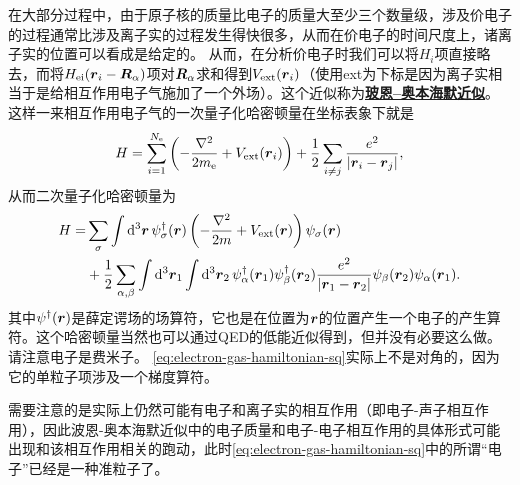 \documentclass[hyperref, UTF8, a4paper]{ctexart}
\newcommand*{\concept}[1]{\underline{\textbf{#1}}}
\begin{document}
在大部分过程中，由于原子核的质量比电子的质量大至少三个数量级，涉及价电子的过程通常比涉及离子实的过程发生得快很多，从而在价电子的时间尺度上，诸离子实的位置可以看成是给定的。
从而，在分析价电子时我们可以将${H}_i$项直接略去，而将${H}_\text{ei}(\vb*{r}_i-\vb*{R}_\alpha)$项对$\vb*{R}_\alpha$求和得到$V_\text{ext}(\vb*{r}_i)$（使用ext为下标是因为离子实相当于是给相互作用电子气施加了一个外场）。这个近似称为\concept{玻恩–奥本海默近似}。这样一来相互作用电子气的一次量子化哈密顿量在坐标表象下就是
\begin{equation}
    {H} = \sum_{i=1}^{N_\text{e}} \left( - \frac{\laplacian}{2m_\text{e}} + V_\text{ext}(\vb*{r}_i)\right) + \frac{1}{2} \sum_{i\neq j} \frac{e^2}{\abs{\vb*{r}_i - \vb*{r}_j}},
    \label{eq:electron-gas-hamiltonian}
\end{equation}
从而二次量子化哈密顿量为
\begin{equation}
    \begin{aligned}
        {H} = &\sum_{\sigma} \int \dd[3]{\vb*{r}} {\psi}_\sigma^\dagger(\vb*{r}) \left( - \frac{\laplacian}{2m} + V_\text{ext}(\vb*{r}) \right) {\psi}_\sigma(\vb*{r}) \\
        &+ \frac{1}{2} \sum_{\alpha, \beta} \int \dd[3]{\vb*{r}_1} \int \dd[3]{\vb*{r}_2} 
        {\psi}_\alpha^\dagger (\vb*{r}_1) {\psi}_\beta^\dagger (\vb*{r}_2) \frac{e^2}{\abs{\vb*{r}_1 - \vb*{r}_2}} {\psi}_\beta (\vb*{r}_2) {\psi}_\alpha (\vb*{r}_1). 
    \end{aligned}
    \label{eq:electron-gas-hamiltonian-sq}
\end{equation}
其中${\psi}^\dagger(\vb*{r})$是薛定谔场的场算符，它也是在位置为$\vb*{r}$的位置产生一个电子的产生算符。这个哈密顿量当然也可以通过QED的低能近似得到，但并没有必要这么做。请注意电子是费米子。
\eqref{eq:electron-gas-hamiltonian-sq}实际上不是对角的，因为它的单粒子项涉及一个梯度算符。

需要注意的是实际上仍然可能有电子和离子实的相互作用（即电子-声子相互作用），因此波恩-奥本海默近似中的电子质量和电子-电子相互作用的具体形式可能出现和该相互作用相关的跑动，此时\eqref{eq:electron-gas-hamiltonian-sq}中的所谓“电子”已经是一种准粒子了。
\end{document}
